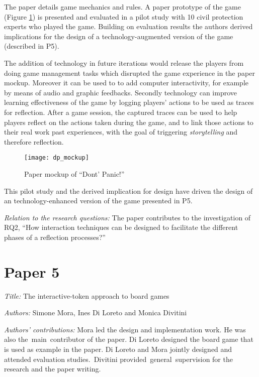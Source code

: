 The paper details game mechanics and rules. A paper prototype of the
game (Figure \ref{fig:dp-mockup}) is presented and evaluated in a pilot
study with 10 civil protection experts who played the game. Building on
evaluation results the authors derived implications for the design of a
technology-augmented version of the game (described in P5).

The addition of technology in future iterations would release the
players from doing game management tasks which disrupted the game
experience in the paper mockup. Moreover it can be used to to add
computer interactivity, for example by means of audio and graphic
feedbacks. Secondly technology can improve learning effectiveness of the
game by logging players' actions to be used as traces for reflection.
After a game session, the captured traces can be used to help players
reflect on the actions taken during the game, and to link those actions
to their real work past experiences, with the goal of triggering
\emph{storytelling} and therefore reflection.

\begin{figure}[tbh]
    \centering
    \texttt{[image: dp\_mockup]}
    \caption{Paper mockup of “Dont’ Panic!”}
    \label{fig:dp-mockup}
\end{figure}

This pilot study and the derived implication for design have driven the
design of an technology-enhanced version of the game presented in P5.

\emph{Relation to the research questions: } The paper contributes to the
investigation of RQ2, ``How interaction techniques can be designed to
facilitate the different phases of a reflection processes?''

\section{Paper 5}\label{paper-5}

\emph{Title:} The interactive-token approach to board games

\emph{Authors:} Simone Mora, Ines Di Loreto and Monica Divitini

\emph{Authors' contributions:} Mora led the design and implementation
work. He was also the~main~contributor of the paper. Di Loreto designed
the board game that is used as example in the paper. Di Loreto and Mora
jointly designed and attended evaluation studies.~Divitini
provided~general~supervision for the research and the paper writing.

